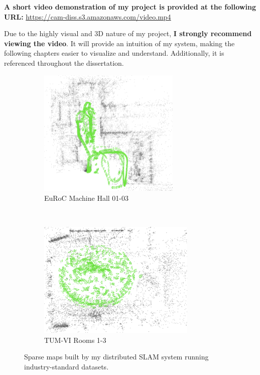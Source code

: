\begin{leftbar}
    \textbf{A short video demonstration of my project is provided at the following URL:} \url{https://cam-diss.s3.amazonaws.com/video.mp4} 

    Due to the highly visual and 3D nature of my project, \textbf{I strongly recommend viewing the video}. It will provide an intuition of my system, making the following chapters easier to visualize and understand. Additionally, it is referenced throughout the dissertation.
\end{leftbar}

\begin{figure}[h]
    \centering
    \captionsetup{format=plain}
    \begin{subfigure}[t]{0.475\linewidth}
        \centering
        \includegraphics[height=2.4in]{figures/euroc_mh_map.png}
        \caption{EuRoC Machine Hall 01-03}
    \end{subfigure}\hfill%
    ~
    \begin{subfigure}[t]{0.475\linewidth}
        \centering
        \includegraphics[height=2.2in]{figures/tum_room_map.png}
        \caption{TUM-VI Rooms 1-3}
    \end{subfigure}

    \caption{Sparse maps built by my distributed SLAM system running industry-standard datasets.}
    \label{fig:example-maps}
\end{figure}
